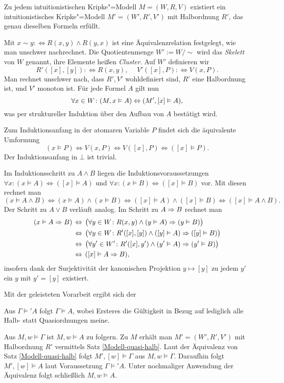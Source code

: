 \begin{Satz}\label{Modell-quasi-halb}
Zu jedem intuitionistischen Kripke"=Modell $M=(W,R,V)$ existiert ein
intuitionistisches Kripke"=Modell $M' = (W',R',V')$ mit Halbordnung
$R'$, das genau dieselben Formeln erfüllt.
\end{Satz}
\begin{Beweis}
Mit $x\sim y:\Leftrightarrow R(x,y)\land R(y,x)$ ist eine
Äquivalenzrelation festgelegt, wie man unschwer nachrechnet.
Die Quotientenmenge $W' := W/{\sim}$ wird das \emph{Skelett} von $W$
genannt, ihre Elemente heißen \emph{Cluster}. Auf $W'$ definieren wir
\[R'([x],[y]) :\Leftrightarrow R(x,y),\quad\; V'([x],P):\Leftrightarrow V(x,P).\]
Man rechnet unschwer nach, dass $R',V'$ wohldefiniert sind, $R'$ eine
Halbordnung ist, und $V'$ monoton ist. Für jede Formel $A$ gilt nun
\[\forall x\in W\colon (M,x\vDash A)\Leftrightarrow (M',[x]\vDash A),\]
was per struktureller Induktion über den Aufbau von $A$ bestätigt wird.

Zum Induktionsanfang in der atomaren Variable $P$ findet sich die äquivalente Umformung
\[(x\models P)\iff V(x,P)\iff V([x],P)\iff ([x]\models P).\]
Der Induktionsanfang in $\bot$ ist trivial.

Im Induktionsschritt zu $A\land B$ liegen die Induktionsvoraussetzungen
$\forall x\colon (x\models A)\Leftrightarrow ([x]\models A)$ und
$\forall x\colon (x\models B)\Leftrightarrow ([x]\models B)$ vor.
Mit diesen rechnet man
\[(x\models A\land B)\iff (x\models A)\land (x\models B)
\iff ([x]\models A)\land ([x]\models B)
\iff ([x]\models A\land B).\]
Der Schritt zu $A\lor B$ verläuft analog. Im Schritt zu $A\Rightarrow B$ rechnet man
\begin{align*}
(x\vDash A\Rightarrow B)&\,\Leftrightarrow\, \big(\forall y\in W\colon R(x,y)\land (y\vDash A)\Rightarrow (y\vDash B)\big)\\
&\,\Leftrightarrow\, \big(\forall y\in W\colon R'([x],[y])\land ([y]\vDash A)\Rightarrow ([y]\vDash B)\big)\\
&\,\Leftrightarrow\, \big(\forall y'\in W'\colon R'([x],y')\land (y'\vDash A)\Rightarrow (y'\vDash B)\big)\\
&\,\Leftrightarrow\, ([x]\vDash A\Rightarrow B),
\end{align*}
insofern dank der Surjektivität der kanonischen Projektion $y\mapsto [y]$
zu jedem $y'$ ein $y$ mit $y'=[y]$ existiert.\,\qedsymbol
\end{Beweis}

\noindent
Mit der geleisteten Vorarbeit ergibt sich der

\begin{Satz}\label{Gueltigkeit-halb-quasi}
Aus $\Gamma\models' A$ folgt $\Gamma\models A$, wobei Ersteres die
Gültigkeit in Bezug auf lediglich alle Halb- statt Quasiordnungen meine.
\end{Satz}
\begin{Beweis}
Aus $M,w\models\Gamma$ ist $M,w\models A$ zu folgern. Zu $M$ erhält man
$M'=(W',R',V')$ mit Halbordnung $R'$ vermittels Satz
\ref{Modell-quasi-halb}. Laut der Äquivalenz von Satz \ref{Modell-quasi-halb}
folgt $M',[w]\models\Gamma$ aus $M,w\models\Gamma$. Daraufhin folgt
$M',[w]\models A$ laut Voraussetzung $\Gamma\models' A$. Unter nochmaliger
Anwendung der Äquivalenz folgt schließlich $M,w\models A$.\,\qedsymbol
\end{Beweis}

